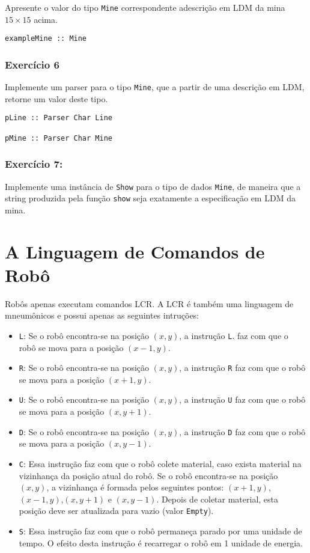 \documentclass[a4paper]{article}
\begin{document}
Apresente o valor do tipo \texttt{Mine} correspondente adescrição em LDM da mina \(15\times 15\) acima.

\begin{verbatim}
exampleMine :: Mine
\end{verbatim}

\subsubsection{Exercício 6}
\label{sec:orgff330b8}

Implemente um parser para o tipo \texttt{Mine}, que a partir de uma descrição em LDM, retorne um valor deste tipo.

\begin{verbatim}
pLine :: Parser Char Line

pMine :: Parser Char Mine
\end{verbatim}

\subsubsection{Exercício 7:}
\label{sec:org28b5c96}
Implemente uma instância de \texttt{Show} para o tipo de dados
\texttt{Mine}, de maneira que a string produzida pela função \texttt{show} seja
exatamente a especificação em LDM da mina.

\section{A Linguagem de Comandos de Robô}
\label{sec:orgad0ea33}

Robôs apenas executam comandos LCR. A LCR é também uma linguagem de mneumônicos
e possui apenas as seguintes intruções:

\begin{itemize}
\item \texttt{L}: Se o robô encontra-se na posição \((x,y)\), a instrução \texttt{L}.
faz com que o robô se mova para a posição \((x - 1,y)\).
\item \texttt{R}: Se o robô encontra-se na posição \((x,y)\), a instrução \texttt{R}
faz com que o robô se mova para a posição \((x + 1,y)\).
\item \texttt{U}: Se o robô encontra-se na posição \((x,y)\), a instrução \texttt{U}
faz com que o robô se mova para a posição \((x,y + 1)\).
\item \texttt{D}: Se o robô encontra-se na posição \((x,y)\), a instrução \texttt{D}
faz com que o robô se mova para a posição \((x,y-1)\).
\item \texttt{C}: Essa instrução faz com que o robô colete material, caso exista
material na vizinhança da posição atual do robô. Se o robô encontra-se na
posição \((x,y)\), a vizinhança é formada pelos seguintes pontos:
\((x+1,y)\), \((x-1,y)\),\((x,y+1)\) e \((x,y-1)\). Depois de coletar material,
esta posição deve ser atualizada para vazio (valor \texttt{Empty}).
\item \texttt{S}: Essa instrução faz com que o robô permaneça parado por uma
unidade de tempo. O efeito desta instrução é recarregar o robô em 1 unidade
de energia.
\end{itemize}
\end{document}
